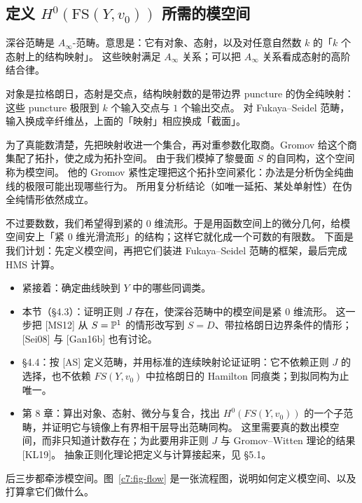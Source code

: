 
\subsection{定义 $H^0(\mathrm{FS}(Y,v_0))$ 所需的模空间}


\begin{remark}[深谷范畴里为何需要模空间]\label{c7:rem-moduli-reason}
深谷范畴是 $A_\infty$-范畴。意思是：它有对象、态射，以及对任意自然数 $k$ 的「$k$ 个态射上的结构映射」。
这些映射满足 $A_\infty$ 关系；可以把 $A_\infty$ 关系看成态射的高阶结合律。

对象是拉格朗日，态射是交点，结构映射数的是带边界 puncture 的伪全纯映射：这些 puncture 极限到 $k$ 个输入交点与 $1$ 个输出交点。
对 Fukaya--Seidel 范畴，输入换成辛纤维丛，上面的「映射」相应换成「截面」。

为了真能数清楚，先把映射收进一个集合，再对重参数化取商。Gromov 给这个商集配了拓扑，使之成为拓扑空间。
由于我们模掉了黎曼面 $S$ 的自同构，这个空间称为模空间。
他的 Gromov 紧性定理把这个拓扑空间紧化：办法是分析伪全纯曲线的极限可能出现哪些行为。
所用复分析结论（如唯一延拓、某处单射性）在伪全纯情形依然成立。

不过要数数，我们希望得到紧的 $0$ 维流形。于是用函数空间上的微分几何，给模空间安上「紧 $0$ 维光滑流形」的结构；这样它就化成一个可数的有限数。
下面是我们计划：先定义模空间，再把它们装进 Fukaya--Seidel 范畴的框架，最后完成 HMS 计算。

\begin{itemize}[leftmargin=1.6em,itemsep=0.2em]
\item 紧接着：确定曲线映到 $Y$ 中的哪些同调类。
\item 本节（§4.3）：证明正则 $J$ 存在，使深谷范畴中的模空间是紧 $0$ 维流形。
      这一步把 [MS12] 从 $S=\mathbb{P}^1$ 的情形改写到 $S=D$、带拉格朗日边界条件的情形；[Sei08] 与 [Gan16b] 也有讨论。
\item §4.4：按 [AS] 定义范畴，并用标准的连续映射论证证明：它不依赖正则 $J$ 的选择，也不依赖 $FS(Y,v_0)$ 中拉格朗日的 Hamilton 同痕类；到拟同构为止唯一。
\item 第 8 章：算出对象、态射、微分与复合，找出 $H^0(FS(Y,v_0))$ 的一个子范畴，并证明它与镜像上有界相干层导出范畴同构。
      这里需要真的数出模空间，而非只知道计数存在；为此要用非正则 $J$ 与 Gromov--Witten 理论的结果 [KL19]。
      抽象正则化理论把定义与计算接起来，见 §5.1。
\end{itemize}

后三步都牵涉模空间。图~\ref{c7:fig-flow} 是一张流程图，说明如何定义模空间、以及打算拿它们做什么。
\end{remark}

